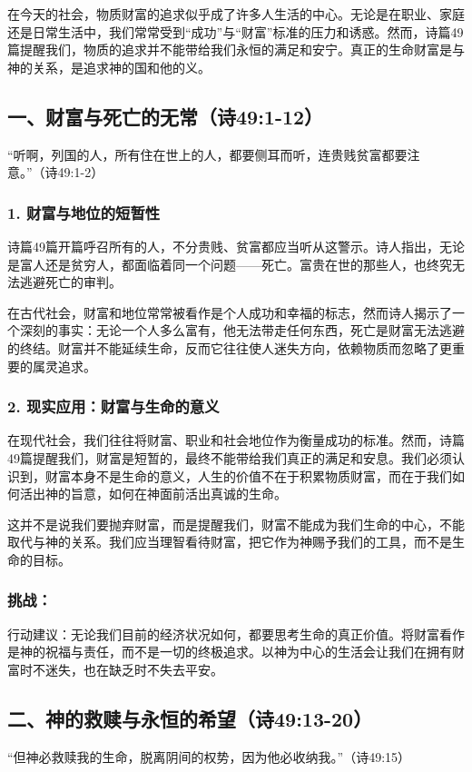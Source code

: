 \documentclass[a4paper, 12pt]{article}
\begin{document}
在今天的社会，物质财富的追求似乎成了许多人生活的中心。无论是在职业、家庭还是日常生活中，我们常常受到“成功”与“财富”标准的压力和诱惑。然而，诗篇49篇提醒我们，物质的追求并不能带给我们永恒的满足和安宁。真正的生命财富是与神的关系，是追求神的国和他的义。

\subsection*{一、财富与死亡的无常（诗49:1-12）}
“听啊，列国的人，所有住在世上的人，都要侧耳而听，连贵贱贫富都要注意。”（诗49:1-2）

\subsubsection*{1. 财富与地位的短暂性}
\hspace{0.6cm}诗篇49篇开篇呼召所有的人，不分贵贱、贫富都应当听从这警示。诗人指出，无论是富人还是贫穷人，都面临着同一个问题——死亡。富贵在世的那些人，也终究无法逃避死亡的审判。

在古代社会，财富和地位常常被看作是个人成功和幸福的标志，然而诗人揭示了一个深刻的事实：无论一个人多么富有，他无法带走任何东西，死亡是财富无法逃避的终结。财富并不能延续生命，反而它往往使人迷失方向，依赖物质而忽略了更重要的属灵追求。
\subsubsection*{2. 现实应用：财富与生命的意义}
\hspace{0.6cm}在现代社会，我们往往将财富、职业和社会地位作为衡量成功的标准。然而，诗篇49篇提醒我们，财富是短暂的，最终不能带给我们真正的满足和安息。我们必须认识到，财富本身不是生命的意义，人生的价值不在于积累物质财富，而在于我们如何活出神的旨意，如何在神面前活出真诚的生命。

这并不是说我们要抛弃财富，而是提醒我们，财富不能成为我们生命的中心，不能取代与神的关系。我们应当理智看待财富，把它作为神赐予我们的工具，而不是生命的目标。
\subsubsection*{挑战：}

行动建议：无论我们目前的经济状况如何，都要思考生命的真正价值。将财富看作是神的祝福与责任，而不是一切的终极追求。以神为中心的生活会让我们在拥有财富时不迷失，也在缺乏时不失去平安。
\subsection*{二、神的救赎与永恒的希望（诗49:13-20）}
“但神必救赎我的生命，脱离阴间的权势，因为他必收纳我。”（诗49:15）
\end{document}
